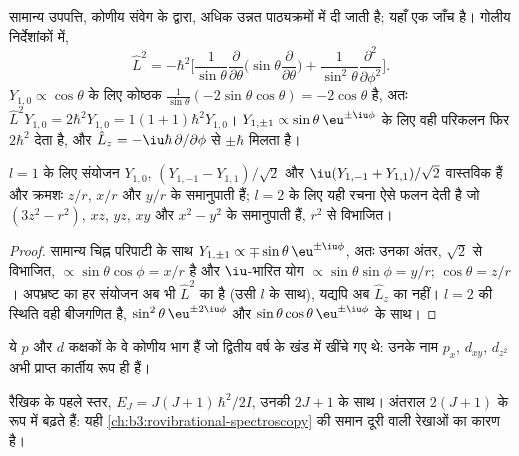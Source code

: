 सामान्य उपपत्ति, कोणीय संवेग के  द्वारा, अधिक उन्नत पाठ्यक्रमों में
दी जाती है; यहाँ एक जाँच है। गोलीय निर्देशांकों में,
\[
\hat L^2 = -\hbar^2\Big[\frac{1}{\sin\theta}\frac{\partial}{\partial\theta}
\Big(\sin\theta\frac{\partial}{\partial\theta}\Big) +
\frac{1}{\sin^2\theta}\frac{\partial^2}{\partial\phi^2}\Big].
\]
$Y_{1,0} \propto \cos\theta$ के लिए कोष्ठक $\frac{1}{\sin\theta}(-2\sin\theta
\cos\theta) = -2\cos\theta$ है, अतः $\hat L^2Y_{1,0} = 2\hbar^2Y_{1,0} = 1(1+1)\hbar^2
Y_{1,0}$। $Y_{1,\pm1} \propto \sin\theta\,\eu^{\pm\iu\phi}$ के लिए वही
परिकलन फिर $2\hbar^2$ देता है, और $\hat L_z = -\iu\hbar\,\partial/\partial
\phi$ से $\pm\hbar$ मिलता है।

\begin{proposition}[वास्तविक गोलीय प्रसंवादी]\label{prop:b3:quantum-model-systems:real-harmonics}
$l = 1$ के लिए संयोजन $Y_{1,0}$, $(Y_{1,-1} - Y_{1,1})/\sqrt2$ और
$\iu(Y_{1,-1} + Y_{1,1})/\sqrt2$ वास्तविक हैं और क्रमशः $z/r$, $x/r$ और
$y/r$ के समानुपाती हैं; $l = 2$ के लिए यही रचना ऐसे फलन देती है जो
$(3z^2 - r^2)$, $xz$, $yz$, $xy$ और $x^2 - y^2$ के समानुपाती हैं, $r^2$ से विभाजित।
\end{proposition}

\begin{proof}
सामान्य चिह्न परिपाटी के साथ $Y_{1,\pm1} \propto \mp\sin\theta\,\eu^{\pm\iu\phi}$,
अतः उनका अंतर, $\sqrt2$ से विभाजित, $\propto\sin\theta\cos\phi =
x/r$ है और $\iu$-भारित योग $\propto\sin\theta\sin\phi = y/r$;
$\cos\theta = z/r$। अपभ्रष्ट  का हर संयोजन अब भी
$\hat L^2$ का  है (उसी $l$ के साथ), यद्यपि अब $\hat
L_z$ का नहीं। $l = 2$ की स्थिति वही बीजगणित है, $\sin^2\theta\,\eu^{\pm2\iu\phi}$
और $\sin\theta\cos\theta\,\eu^{\pm\iu\phi}$ के साथ।
\end{proof}

ये $p$ और $d$ कक्षकों के वे कोणीय भाग हैं जो द्वितीय वर्ष के खंड में खींचे गए थे:
उनके नाम $p_x$, $d_{xy}$, $d_{z^2}$ अभी प्राप्त कार्तीय रूप ही हैं।

\begin{omfigure}

{\small रैखिक  के पहले स्तर, $E_J = J(J+1)\,\hbar^2/2I$,
उनकी  $2J + 1$ के साथ। अंतराल $2(J+1)$ के रूप में बढ़ते हैं: यही
\cref{ch:b3:rovibrational-spectroscopy} की समान दूरी वाली रेखाओं का कारण है।}
\end{omfigure}

